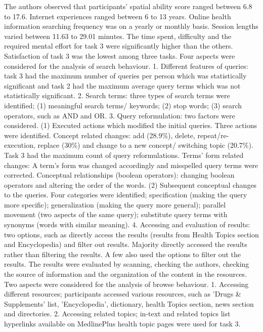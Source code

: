 \documentclass[]{article}
\begin{document}
The authors observed that participants' spatial ability score ranged between 6.8 to 17.6. Internet experiences ranged between 6 to 13 years. Online health information searching frequency was on a yearly or monthly basis. Session lengths varied between 11.63 to 29.01 minutes. The time spent, difficulty and the required mental effort for task 3 were significantly higher than the others. Satisfaction of task 3 was the lowest among three tasks. Four aspects were considered for the analysis of search behaviour. 1. Different features of queries: task 3 had the maximum number of queries per person which was statistically significant and task 2 had the maximum average query terms which was not statistically significant. 2. Search terms: three types of search terms were identified; (1) meaningful search terms/ keywords; (2) stop words; (3) search operators, such as AND and OR. 3. Query reformulation: two factors were considered. (1) Executed actions which modified the initial queries. Three actions were identified. Concept related changes: add (28.9\%), delete, repeat/re-execution, replace (30\%) and change to a new concept/ switching topic (20.7\%). Task 3 had the maximum count of query reformulations. Terms' form related changes: A term's form was changed accordingly and misspelled query terms were corrected. Conceptual relationships (boolean operators): changing boolean operators and altering the order of the words. (2) Subsequent conceptual changes to the queries. Four categories were identified; specification (making the query more specific); generalization (making the query more general); parallel movement (two aspects of the same query); substitute query terms with synonyms (words with similar meaning). 4. Accessing and evaluation of results: two options, such as directly access the results (results from Health Topics section and Encyclopedia) and filter out results. Majority directly accessed the results rather than filtering the results. A few also used the options to filter out the results. The results were evaluated by scanning, checking the authors, checking the source of information and the organization of the content in the resources. Two aspects were considered for the analysis of browse behaviour. 1. Accessing different resources; participants accessed various resources, such as 'Drugs \& Supplements' list, 'Encyclopedia', dictionary, health Topics section, news section and directories. 2. Accessing related topics; in-text and related topics list hyperlinks available on MedlinePlus health topic pages were used for task 3. 
\end{document}
